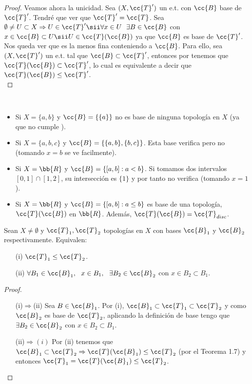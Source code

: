 \begin{teo}
\begin{proof}
        Veamos ahora la unicidad. Sea $(X, \cc{T}')$ un e.t. con $\cc{B}$ base de $\cc{T}'$. Tendré que ver que $\cc{T}'=\cc{T}$. Sea $\emptyset\neq U\subset X \Rightarrow U\in \cc{T}'\sii \forall x \in U\ \ \exists B\in \cc{B}$ con $x\in \cc{B}\subset U \sii U\in \cc{T}(\cc{B})$ ya que $\cc{B}$ es base de $\cc{T}'$.\\

        Nos queda ver que es la menos fina conteniendo a $\cc{B}$. Para ello, sea $(X,\cc{T}')$ un e.t. tal que $\cc{B}\subset \cc{T}'$, entonces por  tenemos que $\cc{T}(\cc{B})\subset \cc{T}'$, lo cual es equivalente a decir que $\cc{T}(\cc{B})\leq \cc{T}'$.\\
    \end{proof}
\end{teo}

\begin{ejemplo}\
    \begin{itemize}
        \item Si $X=\{a,b\}$ y $\cc{B}=\{\{a\}\}$ no es base de ninguna topología en $X$ (ya que no cumple ).
        \item Si $X=\{a,b,c\}$ y $\cc{B}=\{\{a,b\},\{b,c\}\}$. Esta base verifica \apuntar{B1} pero no  (tomando $x=b$ se ve facilmente). %
        \item Si $X=\bb{R}$ y $\cc{B}=\{[a,b]:a<b\}$. Si tomamos dos intervalos $[0,1]\cap [1,2]$, su intersección es $\{1\}$ y por tanto no verifica \apuntar{B2} (tomando $x=1$).
        \item Si $X=\bb{R}$ y $\cc{B}=\{[a,b]:a\leq b\}$ es base de una topología, $\cc{T}(\cc{B})$ en $\bb{R}$. Además, $\cc{T}(\cc{B})=\cc{T}_{disc}$.
    \end{itemize}
    \endsquare
\end{ejemplo}

\begin{prop}
    Sean $X\neq \emptyset$ y $\cc{T}_1, \cc{T}_2$ topologías en $X$ con bases $\cc{B}_1$ y $\cc{B}_2$ respectivamente. Equivalen:
    \begin{enumerate}
        \item[(i)] $\cc{T}_1\leq \cc{T}_2$.
        \item[(ii)] $\forall B_1 \in \cc{B}_1,\ \ x \in B_1,\ \ \exists B_2 \in \cc{B}_2$ con $x\in B_2 \subset B_1$.
    \end{enumerate}
    \begin{proof}\
        \begin{enumerate}
            \item[(i)$\Rightarrow$(ii)] Sea $B \in \cc{B}_1$. Por (i), $\cc{B}_1 \subset \cc{T}_1 \subset \cc{T}_2$ y como $\cc{B}_2$ es base de $\cc{T}_2$, aplicando la definición de base tengo que $\exists B_2 \in \cc{B}_2$ con $x\in B_2 \subset B_1$.
            \item[(ii)$\Rightarrow (i)$] Por (ii) tenemos que $\cc{B}_1\subset \cc{T}_2\Rightarrow \cc{T}(\cc{B}_1)\leq \cc{T}_2$ (por el Teorema 1.7) %
             y entonces $\cc{T}_1=\cc{T}(\cc{B}_1)\leq \cc{T}_2$.
        \end{enumerate}
    \end{proof}
\end{prop}

